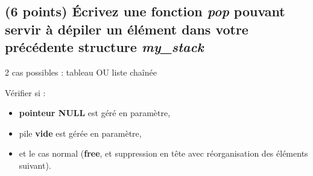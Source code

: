 \documentclass[11pt,a4paper]{article}
\begin{document}
\newpage

\subsection{(6 points) \'Ecrivez une fonction \og \textit{pop} \fg{} pouvant servir à dépiler un élément dans votre précédente structure \og \textit{my\_stack} \fg{} }

\bigskip

\begin{center}

\vspace{2cm}

2 cas possibles : tableau OU liste chaînée

\bigskip

Vérifier si :
\begin{itemize}
\item \textbf{pointeur NULL} est géré en paramètre,
\item pile \textbf{vide} est gérée en paramètre,
\item et le cas normal (\textbf{free}, et suppression en tête avec réorganisation des éléments suivant).
\end{itemize}

\end{center}

\bigskip
\end{document}

